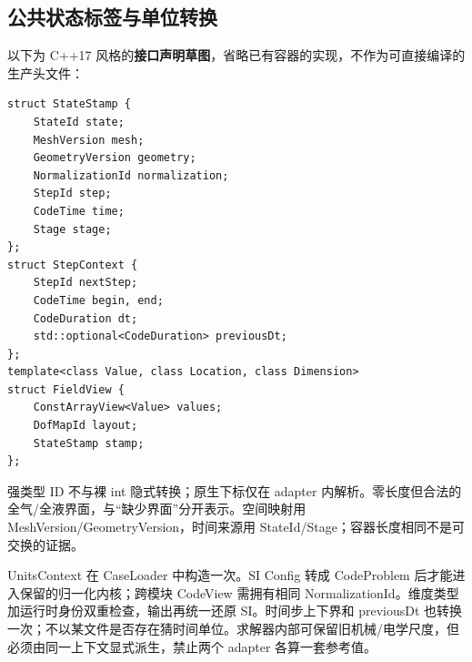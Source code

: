 \documentclass[UTF8,a4paper,11pt,fontset=fandol]{ctexart}
\numberwithin{equation}{section}
\begin{document}
\subsection{公共状态标签与单位转换}
以下为 C++17 风格的\textbf{接口声明草图}，省略已有容器的实现，不作为可直接编译的生产头文件：
{\footnotesize\begin{verbatim}
struct StateStamp {
    StateId state;
    MeshVersion mesh;
    GeometryVersion geometry;
    NormalizationId normalization;
    StepId step;
    CodeTime time;
    Stage stage;
};
struct StepContext {
    StepId nextStep;
    CodeTime begin, end;
    CodeDuration dt;
    std::optional<CodeDuration> previousDt;
};
template<class Value, class Location, class Dimension>
struct FieldView {
    ConstArrayView<Value> values;
    DofMapId layout;
    StateStamp stamp;
};
\end{verbatim}}
强类型 ID 不与裸 int 隐式转换；原生下标仅在 adapter 内解析。零长度但合法的全气/全液界面，与“缺少界面”分开表示。空间映射用 MeshVersion/GeometryVersion，时间来源用 StateId/Stage；容器长度相同不是可交换的证据。

UnitsContext 在 CaseLoader 中构造一次。SI Config 转成 CodeProblem 后才能进入保留的归一化内核；跨模块 CodeView 需拥有相同 NormalizationId。维度类型加运行时身份双重检查，输出再统一还原 SI。时间步上下界和 previousDt 也转换一次；不以某文件是否存在猜时间单位。求解器内部可保留旧机械/电学尺度，但必须由同一上下文显式派生，禁止两个 adapter 各算一套参考值。
\end{document}
